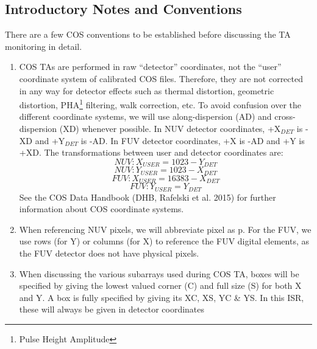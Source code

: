 \subsection{Introductory Notes and Conventions}\label{subsec:conventions}
There are a few COS conventions to be established before discussing the TA monitoring in detail.
\begin{enumerate}
	\item{COS TAs are performed in raw ``detector'' coordinates, not the ``user'' coordinate system of calibrated
		COS files. Therefore, they are not corrected in any way for detector effects such as thermal distortion, geometric distortion,
		PHA\footnote{Pulse Height Amplitude} filtering, walk correction, etc. To avoid confusion over the different coordinate systems, we will use along-dispersion (AD) and cross-dispersion (XD) whenever possible.
		In NUV detector coordinates, +X$_{DET}$ is -XD and +Y$_{DET}$ is -AD. In FUV detector coordinates, +X is -AD and +Y is +XD.
		The transformations between user and detector coordinates are:
		\begin{equation} NUV: X_{USER} = 1023 - Y_{DET} \label{eq:NUVuserX}\end{equation}
		\begin{equation} NUV: Y_{USER} = 1023 - X_{DET} \label{eq:NUVuserY}\end{equation}
		\begin{equation} FUV: X_{USER} = 16383 - X_{DET} \label{eq:FUVuserX}\end{equation}
		\begin{equation} FUV: Y_{USER} = Y_{DET} \label{eq:FUVuserY}\end{equation}
		See the COS Data Handbook (DHB, Rafelski et al. 2015) for further information about COS coordinate systems.
		}
	\item{When referencing NUV pixels, we will abbreviate pixel as p. For the FUV, we use rows (for Y) or columns (for X) to reference the FUV digital elements, as the FUV detector does not have physical pixels.}
	\item{When discussing the various subarrays used during COS TA, boxes will be specified by giving the lowest
		valued corner (C) and full size (S) for both X and Y. A box is fully specified by giving its XC, XS, YC \& YS. In this ISR, these will always be given in detector coordinates
}
\end{enumerate}

